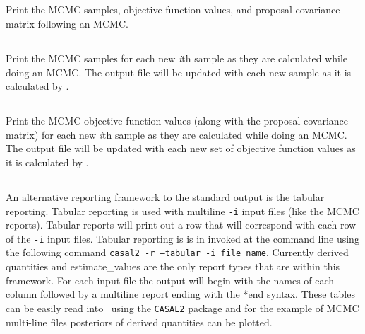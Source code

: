 \subsection{}

Print the MCMC samples, objective function values, and proposal covariance matrix following an MCMC.

\subsection{}

Print the MCMC samples for each new \textit{i}th sample as they are calculated while doing an MCMC. The output file will be updated with each new sample as it is calculated by \CNAME.

\subsection{}

Print the MCMC objective function values (along with the proposal covariance matrix) for each new \textit{i}th sample as they are calculated while doing an MCMC. The output file will be updated with each new set of objective function values as it is calculated by \CNAME.

\subsection{}
An alternative reporting framework to the standard output is the tabular reporting. Tabular reporting is used with multiline \texttt{-i} input files (like the MCMC reports). Tabular reports will print out a row that will correspond with each row of the \texttt{-i} input files. Tabular reporting is is in invoked at the command line using the following command \texttt{casal2 -r --tabular -i file\_name}. Currently derived quantities and estimate\_values are the only report types that are within this framework. For each input file the output will begin with the names of each column followed by a multiline report ending with the *end syntax. These tables can be easily read into \R\ using the \texttt{CASAL2} package and for the example of MCMC multi-line files posteriors of derived quantities can be plotted.


